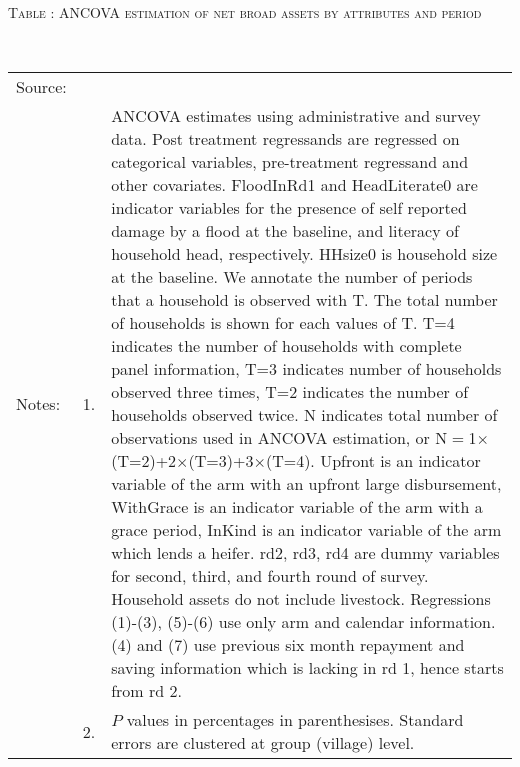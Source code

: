 \hspace{-1cm}\begin{minipage}[t]{14cm}
\hfil\textsc{\normalsize Table \thetable: ANCOVA estimation of net broad assets by attributes and period\label{tab ANCOVA net broad assets timevarying attributes}}\\
\setlength{\tabcolsep}{1pt}
\setlength{\baselineskip}{8pt}
\renewcommand{\arraystretch}{.55}
\hfil{}\\
\renewcommand{\arraystretch}{.8}
\setlength{\tabcolsep}{1pt}
\begin{tabular}{>{\hfill\scriptsize}p{1cm}<{}>{\hfill\scriptsize}p{.25cm}<{}>{\scriptsize}p{12cm}<{\hfill}}
Source:& \multicolumn{2}{l}{\scriptsize Estimated with GUK administrative and survey data.}\\
Notes: & 1. & ANCOVA estimates using administrative and survey data. Post treatment regressands are regressed on categorical variables, pre-treatment regressand and other covariates. \textsf{FloodInRd1} and \textsf{HeadLiterate0} are indicator variables for the presence of self reported damage by a flood at the baseline, and literacy of household head, respectively. \textsf{HHsize0} is household size at the baseline. We annotate the number of periods that a household is observed with \textsf{T}. The total number of households is shown for each values of \textsf{T}. \textsf{T=4} indicates the number of households with complete panel information, \textsf{T=3} indicates number of households observed three times, \textsf{T=2} indicates the number of households observed twice. \textsf{N} indicates total number of observations used in ANCOVA estimation, or \textsf{N$=$1$\times$(T=2)+2$\times$(T=3)+3$\times$(T=4)}.  \textsf{Upfront} is an indicator variable of the arm with an upfront large disbursement, \textsf{WithGrace} is an indicator variable of the arm with a grace period, \textsf{InKind} is an indicator variable of the arm which lends a heifer. \textsf{rd2, rd3, rd4} are dummy variables for second, third, and fourth round of survey. Household assets do not include livestock. Regressions (1)-(3), (5)-(6) use only arm and calendar information. (4) and (7) use previous six month repayment and saving information which is lacking in rd 1, hence starts from rd 2.\\
& 2. & $P$ values in percentages in parenthesises. Standard errors are clustered at group (village) level.
\end{tabular}
\end{minipage}


